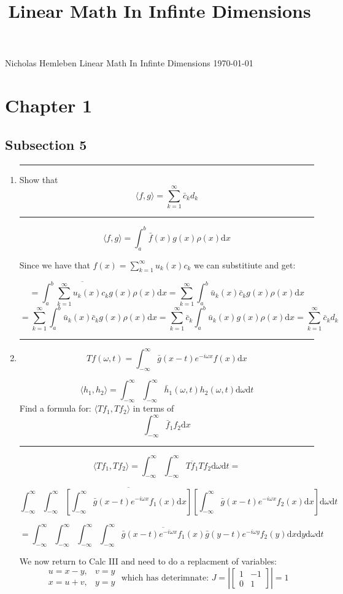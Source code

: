 \documentclass[12pt]{article}
\newcommand{\di}{\mathrm{d}}
\newcommand{\intinf}{\int_{-\infty}^\infty}
\theoremstyle{definition}
\begin{document}
\title{Linear Math In Infinte Dimensions}

{\Large Nicholas Hemleben} \hfill
{\large Linear Math In Infinte Dimensions}  
\hfill  \today

\section{Chapter 1}

\subsection{ Subsection 5}

\begin{enumerate}
\item 
\hrule
{\large 

Show that 
\vspace{-2mm}
\[
\langle f , g \rangle = \sum_{k=1}^\infty \bar c_k d_k 
\]
}
\hrule
\[
\langle f , g \rangle = \int_a^b \bar f (x) g(x) \rho(x) \di x
\]

Since we have that $f(x) = \sum_{k=1}^\infty u_k(x) c_k$ we can substitiute and get:

\[
= \int_a^b \overline { \sum_{k=1}^\infty u_k(x) c_k } g(x) \rho(x) \di x
=  \sum_{k=1}^\infty \int_a^b \bar u_k(x) \bar c_k  g(x) \rho(x) \di x
\]
\[
=  \sum_{k=1}^\infty \int_a^b \bar u_k(x) \bar c_k  g (x)\rho (x)\di x
=  \sum_{k=1}^\infty \bar c_k \int_a^b \bar u_k(x)  g (x)\rho (x)\di x
= \sum_{k=1}^\infty \bar c_k d_k 
\]

\hrule
\item
\[
T f(\omega, t) = 
\int_{-\infty}^\infty \bar g(x-t) e^{-i\omega x} f(x) \di x
\]

\[
\langle h_1, h_2 \rangle = \intinf \intinf \bar h_1(\omega,t) h_2(\omega,t) \di \omega \di t
\]
Find a formula for:
$\langle Tf_1, Tf_2 \rangle $
in terms of 
\[
\intinf \bar f_1 f_2 \di x
\]

\hrule
\[
\langle Tf_1, Tf_2 \rangle 
=
\intinf \intinf 
\overline{Tf_1} Tf_2  \di \omega \di t
=
\]

\[
\intinf \intinf 
\overline{
\left[
\int_{-\infty}^\infty \bar g(x-t) e^{-i\omega x} f_1(x) \di x
\right]
}
\left[
\int_{-\infty}^\infty \bar g(x-t) e^{-i\omega x} f_2(x) \di x
\right]
\di \omega \di t
\]

\[
=
\intinf \intinf 
\intinf \intinf 
\overline{
\bar g(x-t) e^{-i\omega x} f_1(x) 
}
\bar g(y-t) e^{-i\omega y} f_2(y) 
\di x \di y
\di \omega \di t
\]

We now return to Calc III and need to do a replacment of variables:
\[
\begin{matrix}
u = x-y,& v =y \\
x = u+v,& y =y 
\end{matrix}
\text{ which has deterimnate:\ }
J = 
\left|
\begin{bmatrix}
1 & -1 \\
0 & 1 
\end{bmatrix}
\right|
=1
\]


\end{enumerate}
\end{document}
